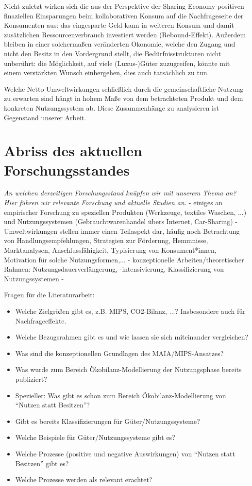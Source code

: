 \documentclass[11pt, titlepage=true]{scrartcl} %
\newcommand{\was}[1]{\small\textit{#1}}
\begin{document}
Nicht zuletzt wirken sich die aus der Perspektive der Sharing Economy positiven
finaziellen Einsparungen beim kollaborativen Konsum auf die Nachfrageseite der
Konsumenten aus: das eingesparte Geld kann in weiteren Konsum und damit
zusätzlichen Ressourcenverbrauch investiert werden (Rebound-Effekt). Außerdem
bleiben in einer solchermaßen veränderten Ökonomie, welche den Zugang und nicht
den Besitz in den Vordergrund stellt, die Bedürfnisstrukturen nicht unberührt:
die Möglichkeit, auf viele (Luxus-)Güter zuzugreifen, könnte mit einem
verstärkten Wunsch einhergehen, dies auch tatsächlich zu tun.

Welche Netto-Umweltwirkungen schließlich durch die gemeinschaftliche Nutzung zu
erwarten sind hängt in hohem Maße von dem betrachteten Produkt und dem konkreten
Nutzungssystem ab.  Diese Zusammenhänge zu
analysieren ist Gegenstand unserer Arbeit.

\section{Abriss des aktuellen Forschungsstandes}
\was{An welchen derzeitigen Forschungsstand knüpfen wir mit unserem Thema an? Hier führen wir relevante Forschung und aktuelle Studien an.}
- einiges an empirischer Forschung zu speziellen Produkten (Werkzeuge, textiles Waschen, ...) und Nutzungssystemen (Gebrauchtwarenhandel übers Internet, Car-Sharing)
- Umweltwirkungen stellen immer einen Teilaspekt dar, häufig noch Betrachtung von Handlungsempfehlungen, Strategien zur Förderung, Hemmnisse, Marktanalysen, Anschlussfähigkeit, Typisierung von Konsument*innen, Motivation für solche Nutzungsformen,...
- konzeptionelle Arbeiten/theoretischer Rahmen: Nutzungsdauerverlängerung, -intensivierung, Klassifizierung von Nutzungssystemen
- 


Fragen für die Literaturarbeit:
\begin{itemize}
	\item Welche Zielgrößen gibt es, z.B. MIPS, CO2-Bilanz, ...? Insbesondere auch für Nachfrageeffekte.
	\item Welche Bezugsrahmen gibt es und wie lassen sie sich miteinander vergleichen?
	\item Was sind die konzeptionellen Grundlagen des MAIA/MIPS-Ansatzes?
	
	\item Was wurde zum Bereich Ökobilanz-Modellierung der Nutzungsphase bereits publiziert?
	\item Spezieller: Was gibt es schon zum Bereich Ökobilanz-Modellierung von \enquote{Nutzen statt Besitzen}?
	
	\item Gibt es bereits Klassifizierungen für Güter/Nutzungssysteme?
	\item Welche Beispiele für Güter/Nutzungssysteme gibt es?
	
	\item Welche Prozesse (positive und negative Auswirkungen) von \enquote{Nutzen statt Besitzen} gibt es?
	\item Welche Prozesse werden als relevant erachtet?
\end{itemize}
\end{document}
